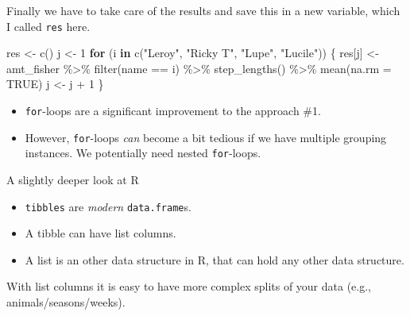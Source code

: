 \documentclass[ignorenonframetext,,t]{beamer}
\let\oldtextbf\textbf
\renewcommand{\textbf}[1]{\textcolor{spamwell}{\oldtextbf{#1}}}
\providecommand{\tightlist}{%
\setlength{\itemsep}{0pt}\setlength{\parskip}{0pt}}
\newenvironment{Shaded}{\begin{snugshade}}{\end{snugshade}}
\newcommand{\AttributeTok}[1]{\textcolor[rgb]{0.77,0.63,0.00}{#1}}
\newcommand{\ConstantTok}[1]{\textcolor[rgb]{0.00,0.00,0.00}{#1}}
\newcommand{\ControlFlowTok}[1]{\textcolor[rgb]{0.13,0.29,0.53}{\textbf{#1}}}
\newcommand{\DecValTok}[1]{\textcolor[rgb]{0.00,0.00,0.81}{#1}}
\newcommand{\FunctionTok}[1]{\textcolor[rgb]{0.00,0.00,0.00}{#1}}
\newcommand{\NormalTok}[1]{#1}
\newcommand{\OtherTok}[1]{\textcolor[rgb]{0.56,0.35,0.01}{#1}}
\newcommand{\SpecialCharTok}[1]{\textcolor[rgb]{0.00,0.00,0.00}{#1}}
\newcommand{\StringTok}[1]{\textcolor[rgb]{0.31,0.60,0.02}{#1}}
\providecommand{\tightlist}{%
\setlength{\itemsep}{0pt}\setlength{\parskip}{0pt}}
\renewcommand{\tightlist}{\setlength{\itemsep}{1.4ex}\setlength{\parskip}{0pt}}
\begin{document}
\begin{frame}[fragile]
Finally we have to take care of the results and save this in a new
variable, which I called \texttt{res} here.

\begin{Shaded}
\begin{Highlighting}[]
\NormalTok{res }\OtherTok{\textless{}{-}} \FunctionTok{c}\NormalTok{()}
\NormalTok{j }\OtherTok{\textless{}{-}} \DecValTok{1}
\ControlFlowTok{for}\NormalTok{ (i }\ControlFlowTok{in} \FunctionTok{c}\NormalTok{(}\StringTok{"Leroy"}\NormalTok{, }\StringTok{"Ricky T"}\NormalTok{, }\StringTok{"Lupe"}\NormalTok{, }\StringTok{"Lucile"}\NormalTok{)) \{}
\NormalTok{  res[j] }\OtherTok{\textless{}{-}}\NormalTok{ amt\_fisher }\SpecialCharTok{\%\textgreater{}\%} \FunctionTok{filter}\NormalTok{(name }\SpecialCharTok{==}\NormalTok{ i) }\SpecialCharTok{\%\textgreater{}\%} 
    \FunctionTok{step\_lengths}\NormalTok{() }\SpecialCharTok{\%\textgreater{}\%} \FunctionTok{mean}\NormalTok{(}\AttributeTok{na.rm =} \ConstantTok{TRUE}\NormalTok{)}
\NormalTok{  j }\OtherTok{\textless{}{-}}\NormalTok{ j }\SpecialCharTok{+} \DecValTok{1}
\NormalTok{\}}
\end{Highlighting}
\end{Shaded}
\end{frame}

\begin{frame}[fragile]
\begin{itemize}
\tightlist
\item
  \texttt{for}-loops are a significant improvement to the approach \#1.
\item
  However, \texttt{for}-loops \emph{can} become a bit tedious if we have
  multiple grouping instances. We potentially need nested
  \texttt{for}-loops.
\end{itemize}
\end{frame}

\begin{frame}[fragile]{A slightly deeper look at R}
\protect\hypertarget{a-slightly-deeper-look-at-r}{}
\begin{itemize}
\tightlist
\item
  \texttt{tibbles} are \emph{modern} \texttt{data.frame}s.
\item
  A tibble can have list columns.
\item
  A list is an other data structure in R, that can hold any other data
  structure.
\end{itemize}

With list columns it is easy to have more complex splits of your data
(e.g., animals/seasons/weeks).
\end{frame}
\end{document}
